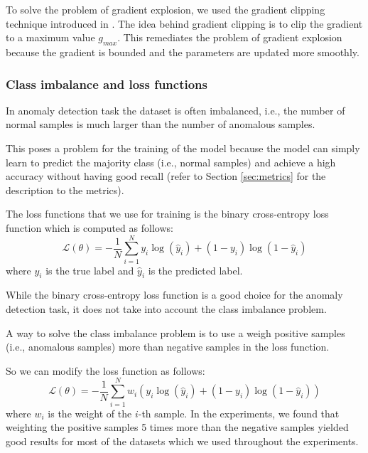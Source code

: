 \documentclass[a4paper, twoside]{report}
\theoremstyle{definition}
\numberwithin{equation}{section}
\begin{document}
To solve the problem of gradient explosion, we used the gradient clipping technique introduced
in \cite{1211.5063}.
The idea behind gradient clipping is to clip the gradient to a maximum value $g_{max}$.
This remediates the problem of gradient explosion because the gradient is bounded and the parameters
are updated more smoothly.

\subsubsection{Class imbalance and loss functions} \label{sec:class_imbalance}

In anomaly detection task the dataset is often imbalanced, i.e., the number of normal samples
is much larger than the number of anomalous samples.

This poses a problem for the training of the model because the model can simply learn to predict
the majority class (i.e., normal samples) and achieve a high accuracy without having
good recall (refer to Section \ref{sec:metrics} for the description to the metrics).

The loss functions that we use for training is the binary cross-entropy loss function
\cite{Good_1952}
which is computed as follows:
\begin{equation} \label{eq:binary_cross_entropy}
    \mathcal{L}(\theta)=-\frac{1}{N} \sum_{i=1}^N y_i \log(\hat{y}_i) + (1-y_i) \log(1-\hat{y}_i)
\end{equation}
where $y_i$ is the true label and $\hat{y}_i$ is the predicted label.

While the binary cross-entropy loss function is a good choice for the anomaly detection task,
it does not take into account the class imbalance problem.

A way to solve the class imbalance problem is to use a weigh positive
samples (i.e., anomalous samples) more than negative samples in the loss function.

So we can modify the loss function as follows:
\begin{equation} \label{eq:weighted_binary_cross_entropy}
    \mathcal{L}(\theta)=-\frac{1}{N} \sum_{i=1}^N w_i (y_i \log(\hat{y}_i) + (1-y_i) \log(1-\hat{y}_i))
\end{equation}
where $w_i$ is the weight of the $i$-th sample.
In the experiments, we found that weighting the positive samples 5 times more than the negative samples
yielded good results for most of the datasets which we used throughout the experiments.
\end{document}
